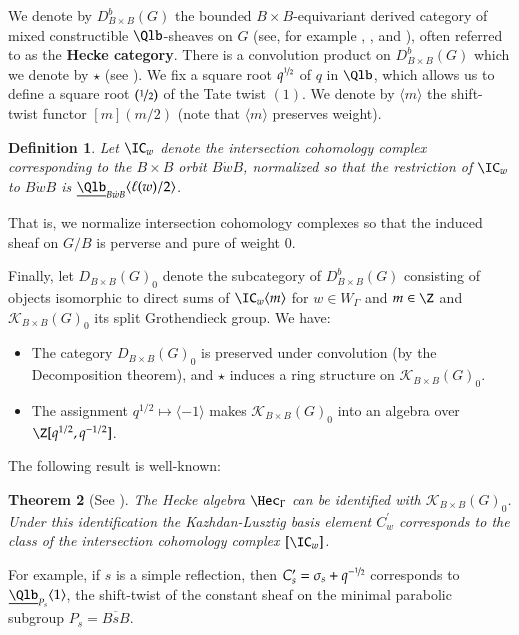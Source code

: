 \documentclass[12pt]{amsart}
\newtheorem{thm}{Theorem}%
\newtheorem{defi}[thm]{Definition}
\theoremstyle{remark}
\begin{document}
We denote by $D^b_{B \times B}(G)$ the bounded $B \! \times \!B$-equivariant
derived category of mixed constructible $\Qlb$-sheaves
on $G$ (see, for example \cite{SGA4}, \cite{SGA4h}, \cite{BBD} and \cite{BL}), often referred to as the {\bf Hecke category}. There is a convolution product on $D^b_{B \times B}(G)$ which we denote by $\star$ (see \cite{SpIH}). We fix a square root
$q^{\nicefrac 12}$ of $q$ in $\Qlb$, which allows us to define a
square root $(\nicefrac 12)$ of the Tate twist $(1)$. 
We denote by $\langle m \rangle$ the shift-twist functor $[m](m/2)$ (note that $\langle m \rangle$ preserves weight).%

\begin{defi} \label{def:ICnorm}
  Let $\IC_w$ denote the intersection cohomology complex corresponding
  to the $B \times B$ orbit $B\dot{w}B$, normalized so that the restriction
  of $\IC_w$ to $B\dot{w}B$ is $\underline{\Qlb}_{B\dot{w}B} \langle \ell(w)/2
  \rangle$.
\end{defi}

That is, we normalize intersection cohomology complexes so
  that the induced sheaf on $G/B$ is perverse and pure of weight 0.

Finally, let $D_{B \times B}(G)_0$ denote the subcategory of $D^b_{B
  \times B}(G)$ consisting of objects isomorphic to direct sums of
$\IC_w\langle m \rangle$ for $w \in W_{\Gamma}$ and $m \in \Z$ and
$\mathscr{K}_{B \times B}(G)_0$ its split Grothendieck group. We have:
\begin{itemize}
 \item The category $D_{B \times B}(G)_0$ is preserved under convolution (by the
   Decomposition theorem), and $\star$
  induces a ring structure on $\mathscr{K}_{B \times B}(G)_0$.
\item  The
  assignment $q^{1/2} \mapsto \langle {-1} \rangle $ makes
  $\mathscr{K}_{B \times B}(G)_0$ into an algebra over
  $\Z[q^{1/2},q^{-1/2}]$.
\end{itemize}
The following result is well-known:

\begin{thm}[See \cite{SpIH}]
\label{thm-heckeconv}
The Hecke algebra $\Hec_{\Gamma}$ can be identified with
$\mathscr{K}_{B \times B}(G)_0$. Under this identification the
Kazhdan-Lusztig basis element $C_w^{\prime}$ corresponds to the class of the
intersection cohomology complex $[ \IC_w ]$.
\end{thm}

For example, if $s$ is a simple reflection, then $C_s^{\prime} =
\sigma_s + q^{-\nicefrac 12}$ corresponds to
$\underline{\Qlb}_{P_s}\langle 1 \rangle$, the shift-twist of the
constant sheaf on the minimal parabolic subgroup $P_s = \overline{BsB}$.
\end{document}
